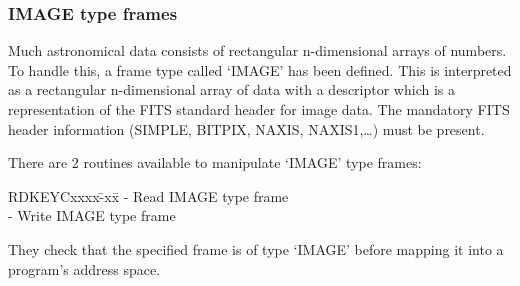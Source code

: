\documentclass{article}
\begin{document}
\subsubsection {IMAGE type frames}
Much astronomical data consists of rectangular n-dimensional arrays of numbers.
To handle this, a frame type called `IMAGE' has been defined.
This is interpreted as a rectangular n-dimensional array of data with a
descriptor which is a representation of the FITS standard header for image data.
The mandatory FITS header information (SIMPLE, BITPIX, NAXIS, NAXIS1,\ldots)
must be present.

There are 2 routines available to manipulate `IMAGE' type frames:
\begin{tabbing}
\hspace{40mm}RDKEYCxxxx\=-xx\=\kill
\hspace{40mm}{\bf RDIMAG} \>- \>Read IMAGE type frame\\
\hspace{40mm}{\bf WRIMAG} \>- \>Write IMAGE type frame
\end{tabbing}
They check that the specified frame is of type `IMAGE' before mapping it into a
program's address space.
\end{document}
